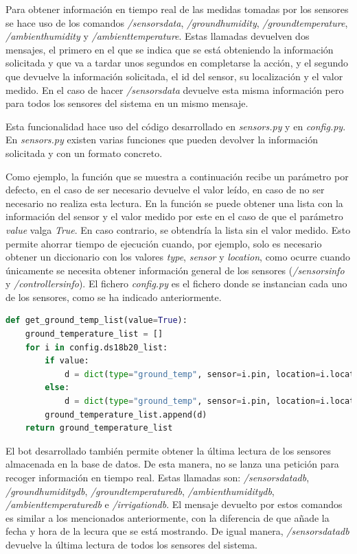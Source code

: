 \documentclass[a4paper, 12pt, oneside]{book}
\begin{document}
Para obtener información en tiempo real de las medidas tomadas por los sensores se hace uso de los comandos \textit{/sensorsdata}, \textit{/groundhumidity}, \textit{/groundtemperature}, \textit{/ambienthumidity} y \textit{/ambienttemperature}. Estas llamadas devuelven dos mensajes, el primero en el que se indica que se está obteniendo la información solicitada y que va a tardar unos segundos en completarse la acción, y el segundo que devuelve la información solicitada, el id del sensor, su localización y el valor medido. En el caso de hacer \textit{/sensorsdata} devuelve esta misma información pero para todos los sensores del sistema en un mismo mensaje.

Esta funcionalidad hace uso del código desarrollado en \textit{sensors.py} y en \textit{config.py}. En \textit{sensors.py} existen varias funciones que pueden devolver la información solicitada y con un formato concreto. 

Como ejemplo, la función que se muestra a continuación recibe un parámetro por defecto, en el caso de ser necesario devuelve el valor leído, en caso de no ser necesario no realiza esta lectura.
En la función se puede obtener una lista con la información del sensor y el valor medido por este en el caso de que el parámetro \textit{value} valga \textit{True}. En caso contrario, se obtendría la lista sin el valor medido. 
Esto permite ahorrar tiempo de ejecución cuando, por ejemplo, solo es necesario obtener un diccionario con los valores \textit{type}, \textit{sensor} y \textit{location}, como ocurre cuando únicamente se necesita obtener información general de los sensores (\textit{/sensorsinfo} y \textit{/controllersinfo}).
El fichero \textit{config.py} es el fichero donde se instancian cada uno de los sensores, como se ha indicado anteriormente.

\begin{lstlisting}[language=Python]
def get_ground_temp_list(value=True):
    ground_temperature_list = []
    for i in config.ds18b20_list:
        if value:
            d = dict(type="ground_temp", sensor=i.pin, location=i.location, 		value=read_ground_temperature(i.pin))
        else:
            d = dict(type="ground_temp", sensor=i.pin, location=i.location)
        ground_temperature_list.append(d)
    return ground_temperature_list
\end{lstlisting}

El bot desarrollado también permite obtener la última lectura de los sensores almacenada en la base de datos. De esta manera, no se lanza una petición para recoger información en tiempo real. Estas llamadas son: \textit{/sensorsdatadb}, \textit{/groundhumiditydb}, \textit{/groundtemperaturedb}, \textit{/ambienthumiditydb}, \textit{/ambienttemperaturedb} e \textit{/irrigationdb}. El mensaje devuelto por estos comandos es similar a los mencionados anteriormente, con la diferencia de que añade la fecha y hora de la lecura que se está mostrando. De igual manera, \textit{/sensorsdatadb} devuelve la última lectura de todos los sensores del sistema.
\end{document}
